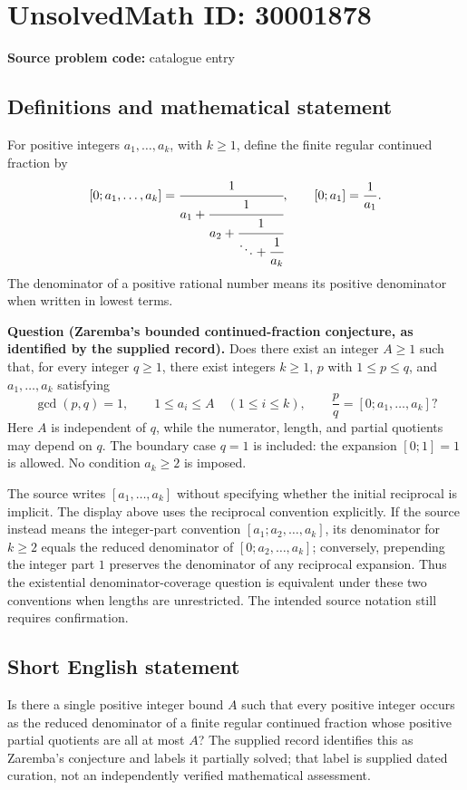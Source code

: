 \documentclass[11pt]{article}
\begin{document}
\section*{UnsolvedMath ID: 30001878}
\textbf{Source problem code:} catalogue entry
\subsection{Definitions and mathematical statement}
For positive integers \(a_1,\ldots,a_k\), with \(k\geq 1\), define the finite regular continued fraction by
\[
[0;a_1,\ldots,a_k]
=\cfrac{1}{a_1+\cfrac{1}{a_2+\cfrac{1}{\ddots+\cfrac{1}{a_k}}}},
\qquad [0;a_1]=\frac{1}{a_1}.
\]
The denominator of a positive rational number means its positive denominator when written in lowest terms.

\textbf{Question (Zaremba's bounded continued-fraction conjecture, as identified by the supplied record).} Does there exist an integer \(A\geq 1\) such that, for every integer \(q\geq 1\), there exist integers \(k\geq 1\), \(p\) with \(1\leq p\leq q\), and \(a_1,\ldots,a_k\) satisfying
\[
\gcd(p,q)=1,\qquad
1\leq a_i\leq A\quad(1\leq i\leq k),\qquad
\frac{p}{q}=[0;a_1,\ldots,a_k]?
\]
Here \(A\) is independent of \(q\), while the numerator, length, and partial quotients may depend on \(q\). The boundary case \(q=1\) is included: the expansion \([0;1]=1\) is allowed. No condition \(a_k\geq 2\) is imposed.

The source writes \([a_1,\ldots,a_k]\) without specifying whether the initial reciprocal is implicit. The display above uses the reciprocal convention explicitly. If the source instead means the integer-part convention \([a_1;a_2,\ldots,a_k]\), its denominator for \(k\geq 2\) equals the reduced denominator of \([0;a_2,\ldots,a_k]\); conversely, prepending the integer part \(1\) preserves the denominator of any reciprocal expansion. Thus the existential denominator-coverage question is equivalent under these two conventions when lengths are unrestricted. The intended source notation still requires confirmation.
\subsection{Short English statement}
Is there a single positive integer bound \(A\) such that every positive integer occurs as the reduced denominator of a finite regular continued fraction whose positive partial quotients are all at most \(A\)? The supplied record identifies this as Zaremba's conjecture and labels it partially solved; that label is supplied dated curation, not an independently verified mathematical assessment.
\end{document}
